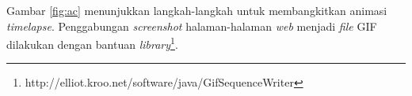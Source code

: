 Gambar \ref{fig:ac} menunjukkan langkah-langkah untuk membangkitkan animasi \textit{timelapse}. Penggabungan \textit{screenshot} halaman-halaman \textit{web} menjadi \textit{file} GIF dilakukan dengan bantuan \textit{library}\footnote{http://elliot.kroo.net/software/java/GifSequenceWriter}.


